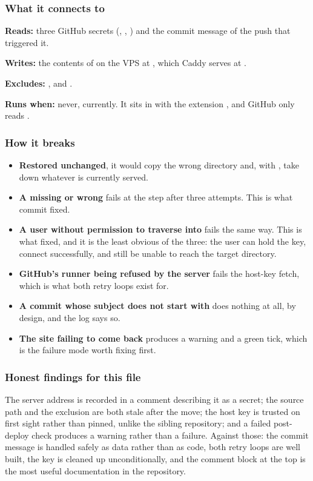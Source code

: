 \subsubsection*{What it connects to}

\textbf{Reads:} three GitHub secrets (, ,
) and the commit message of the push that triggered it.

\textbf{Writes:} the contents of  on the VPS at
, which Caddy serves at .

\textbf{Excludes:} ,  and .

\textbf{Runs when:} never, currently. It sits in
 with the extension , and GitHub
only reads .

\subsubsection*{How it breaks}

\begin{itemize}
\item \textbf{Restored unchanged}, it would copy the wrong directory and, with
  , take down whatever is currently served.
\item \textbf{A missing or wrong } fails at the 
  step after three attempts. This is what commit  fixed.
\item \textbf{A  user without permission to traverse into
  } fails the same way. This is what  fixed, and it is the
  least obvious of the three: the user can hold the key, connect successfully, and
  still be unable to reach the target directory.
\item \textbf{GitHub's runner being refused by the server} fails the host-key fetch,
  which is what both retry loops exist for.
\item \textbf{A commit whose subject does not start with \code{[deploy]}} does
  nothing at all, by design, and the log says so.
\item \textbf{The site failing to come back} produces a warning and a green tick,
  which is the failure mode worth fixing first.
\end{itemize}

\subsubsection*{Honest findings for this file}

The server address is recorded in a comment describing it as a secret; the
 source path and the  exclusion are both stale after
the move; the host key is trusted on first sight rather than pinned, unlike the
sibling  repository; and a failed post-deploy check
produces a warning rather than a failure. Against those: the commit message is
handled safely as data rather than as code, both retry loops are well built, the
key is cleaned up unconditionally, and the comment block at the top is the most
useful documentation in the repository.
